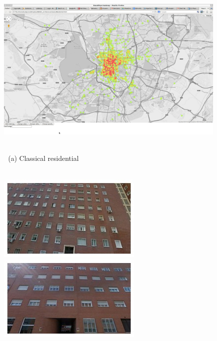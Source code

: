 \begin{figure}
\begin{minipage}{\linewidth}
\begin{minipage}{0.3\linewidth}
    \end{minipage}
    \begin{minipage}{0.7\linewidth}
      \includegraphics[trim= 350 150 250 150, clip=true, width=\linewidth]{imgs/arch/mapS2.jpg}
    \end{minipage}
  \end{minipage}
  \\
  $\;$ \hspace{30mm} (a) Classical residential
  \\
  \\
  \begin{minipage}{\linewidth}
    \begin{minipage}{0.3\linewidth}
      \includegraphics[width=0.49\linewidth]{imgs/arch/mosaicsS3/mosaic0000.jpg}
      \includegraphics[width=0.49\linewidth]{imgs/arch/mosaicsS3/mosaic0001.jpg}
      \\ \vspace{-3mm} \\

\end{minipage}
\end{minipage}
\end{figure}
